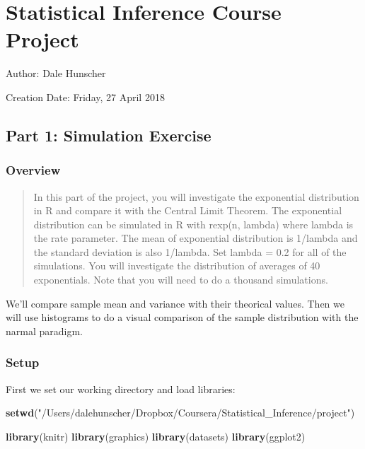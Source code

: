 \documentclass[]{article}
\title{}
\author{}
\date{}
\newenvironment{Shaded}{\begin{snugshade}}{\end{snugshade}}
\newcommand{\KeywordTok}[1]{\textcolor[rgb]{0.13,0.29,0.53}{\textbf{#1}}}
\newcommand{\StringTok}[1]{\textcolor[rgb]{0.31,0.60,0.02}{#1}}
\newcommand{\NormalTok}[1]{#1}
\begin{document}
\section{Statistical Inference Course
Project}\label{statistical-inference-course-project}

Author: Dale Hunscher

Creation Date: Friday, 27 April 2018

\subsection{Part 1: Simulation
Exercise}\label{part-1-simulation-exercise}

\subsubsection{Overview}\label{overview}

\begin{quote}
In this part of the project, you will investigate the exponential
distribution in R and compare it with the Central Limit Theorem. The
exponential distribution can be simulated in R with rexp(n, lambda)
where lambda is the rate parameter. The mean of exponential distribution
is 1/lambda and the standard deviation is also 1/lambda. Set lambda =
0.2 for all of the simulations. You will investigate the distribution of
averages of 40 exponentials. Note that you will need to do a thousand
simulations.
\end{quote}

We'll compare sample mean and variance with their theorical values. Then
we will use histograms to do a visual comparison of the sample
distribution with the narmal paradigm.

\subsubsection{Setup}\label{setup}

First we set our working directory and load libraries:

\begin{Shaded}
\begin{Highlighting}[]
\KeywordTok{setwd}\NormalTok{(}\StringTok{"/Users/dalehunscher/Dropbox/Coursera/Statistical_Inference/project"}\NormalTok{)}

\KeywordTok{library}\NormalTok{(knitr) }
\KeywordTok{library}\NormalTok{(graphics)}
\KeywordTok{library}\NormalTok{(datasets)}
\KeywordTok{library}\NormalTok{(ggplot2)}
\end{Highlighting}
\end{Shaded}
\end{document}
